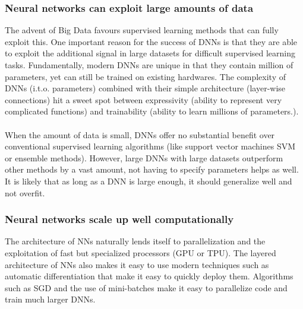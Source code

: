 \subsubsection{Neural networks can exploit large amounts of data}
The advent of Big Data favours supervised learning methods that can fully exploit this. One important reason for the success of DNNs is that they are able to exploit the additional signal in large datasets for difficult supervised learning tasks. Fundamentally, modern DNNs are unique in that they contain million of parameters, yet can still be trained on existing hardwares. The complexity of DNNs (i.t.o. parameters) combined with their simple architecture (layer-wise connections) hit a sweet spot between expressivity (ability to represent very complicated functions) and trainability (ability to learn millions of parameters.).\\
\\
When the amount of data is small, DNNs offer no substantial benefit over conventional supervised learning algorithms (like support vector machines SVM or ensemble methods). However, large DNNs with large datasets outperform other methods by a vast amount, not having to specify parameters helps as well. It is likely that as long as a DNN is large enough, it should generalize well and not overfit.

\subsubsection{Neural networks scale up well computationally}
The architecture of NNs naturally lends itself to parallelization and the exploitation of fast but specialized processors (GPU or TPU). The layered architecture of NNs also makes it easy to use modern techniques such as automatic differentiation that make it easy to quickly deploy them. Algorithms such as SGD and the use of mini-batches make it easy to parallelize code and train much larger DNNs.

